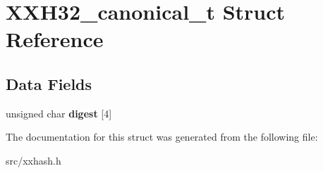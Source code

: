 \hypertarget{structXXH32__canonical__t}{}\section{X\+X\+H32\+\_\+canonical\+\_\+t Struct Reference}
\label{structXXH32__canonical__t}
\subsection*{Data Fields}
\begin{DoxyCompactItemize}
\item 
\mbox{\label{structXXH32__canonical__t_a85a83578344a5dd1c7a6cc0472230f30}} 
unsigned char {\bfseries digest} \mbox{[}4\mbox{]}
\end{DoxyCompactItemize}


The documentation for this struct was generated from the following file\+:\begin{DoxyCompactItemize}
\item 
src/xxhash.\+h\end{DoxyCompactItemize}
